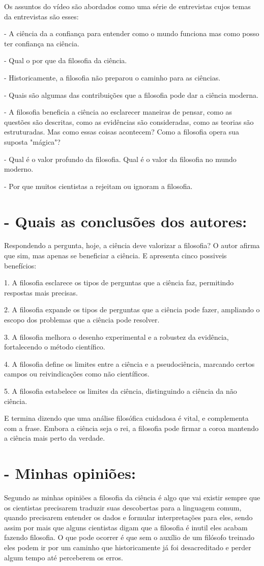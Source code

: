 \documentclass{article}
\begin{document}
Os assuntos do vídeo são abordados como uma série de entrevistas cujos temas da entrevistas são esses: 

  - A ciência da a confiança para entender como o mundo funciona mas como posso ter confiança na ciência.
  
  - Qual o por que da filosofia da ciência.
  
  - Historicamente, a filosofia não preparou o caminho para as ciências.
  
  - Quais são algumas das contribuições que a filosofia pode dar a ciência moderna.
  
  - A filosofia beneficia a ciência ao esclarecer maneiras de pensar, como as questões são descritas, como as evidências são consideradas, como as teorias são estruturadas. Mas como essas coisas acontecem? Como a filosofia opera sua suposta "mágica"?
  
  - Qual é o valor profundo da filosofia. Qual é o valor da filosofia no mundo moderno.
  
  - Por que muitos cientistas a rejeitam ou ignoram a filosofia.
  
  
\section*{- Quais as conclusões dos autores:}

Respondendo a pergunta, hoje, a ciência deve valorizar a filosofia? O autor afirma que sim, mas apenas se beneficiar a ciência. E apresenta cinco possiveis benefícios:
  
  1. A filosofia esclarece os tipos de perguntas que a ciência faz, permitindo respostas mais precisas.
  
  2. A filosofia expande os tipos de perguntas que a ciência pode fazer, ampliando o escopo dos problemas que a ciência pode resolver.
  
  3. A filosofia melhora o desenho experimental e a robustez da evidência, fortalecendo o método científico.
  
  4. A filosofia define os limites entre a ciência e a pseudociência, marcando certos campos ou reivindicações como não científicos.
  
  5. A filosofia estabelece os limites da ciência, distinguindo a ciência da não ciência.
  
E termina dizendo que uma análise filosófica cuidadosa é vital, e complementa com a frase. Embora a ciência seja o rei, a filosofia pode firmar a coroa mantendo a ciência mais perto da verdade.
  
\section*{- Minhas opiniões:}

Segundo as minhas opiniões a filosofia da ciência é algo que vai existir sempre que os cientistas precisarem  traduzir suas descobertas para a linguagem comum, quando precisarem entender os dados e formular interpretações para eles, sendo assim por mais que alguns cientistas digam que a filosofia é inutil eles acabam fazendo filosofia. O que pode ocorrer é que sem o auxílio de um filósofo treinado eles podem ir por um caminho que historicamente já foi desacreditado e perder algum tempo até perceberem os erros.
\end{document}
